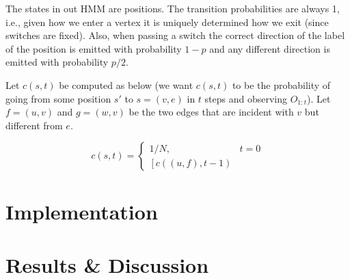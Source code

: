 \documentclass[a4paper,11pt]{kth-mag}
\begin{document}
    The states in out HMM are positions. The transition probabilities are
    always 1, i.e., given how we enter a vertex it is uniquely determined how
    we exit (since switches are fixed). Also, when passing a switch the correct
    direction of the label of the position is emitted with probability $1-p$
    and any different direction is emitted with probability $p/2$.

    Let $c(s,t)$ be computed as below (we want $c(s,t)$ to be the probability
    of going from some position $s'$ to $s=(v,e)$ in $t$ steps and observing
    $O_{1:t}$). Let $f=(u,v)$ and $g=(w,v)$ be the two edges that are incident
    with $v$ but different from $e$.

    \begin{equation}
        c(s,t) =
        \begin{cases}
            1/N, & t = 0 \\
            \left[c((u,f),t-1)
        \end{cases}
    \end{equation}

    \chapter{Implementation}
        
    \chapter{Results \& Discussion}
        
\end{document}
